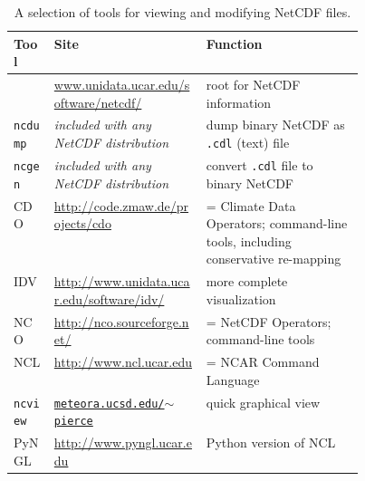 \newcommand{\netcdftool}[1]{#1\index{NetCDF!tools!#1}}
\begin{table}[ht]
\centering
\small
\begin{tabular}{llp{0.45\linewidth}}
  \toprule
  \textbf{Tool} & \textbf{Site} & \textbf{Function} \\
  \midrule
  & \url{www.unidata.ucar.edu/software/netcdf/} & root for NetCDF information \\
  \midrule
  \netcdftool{\texttt{ncdump}} & \emph{included with any NetCDF distribution} & dump binary NetCDF as \texttt{.cdl} (text) file \\
  \netcdftool{\texttt{ncgen}} & \emph{included with any NetCDF distribution} & convert \texttt{.cdl} file to binary NetCDF \\
  \midrule
  \netcdftool{CDO} & \url{http://code.zmaw.de/projects/cdo} & = Climate Data Operators; command-line tools, including conservative re-mapping \\
  \netcdftool{IDV} & \url{http://www.unidata.ucar.edu/software/idv/} & more complete visualization \\
  \netcdftool{NCO}\index{NCO (NetCDF Operators)} & \url{http://nco.sourceforge.net/} & = NetCDF Operators; command-line tools\\
  \netcdftool{NCL} &  \url{http://www.ncl.ucar.edu} & = NCAR Command Language\\
  \netcdftool{\texttt{ncview}} & \href{http://meteora.ucsd.edu/~pierce/ncview_home_page.html}{\texttt{meteora.ucsd.edu/$\sim$pierce}} & quick graphical view \\
  \netcdftool{PyNGL} &  \url{http://www.pyngl.ucar.edu} & Python version of NCL\\
  \bottomrule
\end{tabular}
\normalsize
\caption{A selection of tools for viewing and modifying NetCDF files.}
\label{tab:NetCDFview}
\end{table}




